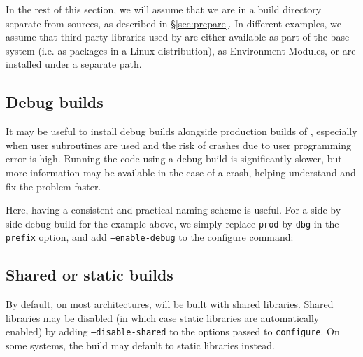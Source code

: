 \documentclass[a4paper,10pt,twoside]{csshortdoc}
\begin{document}
In the rest of this section, we will assume that we are in
a build directory separate from sources, as described in
\S\ref{sec:prepare}. In different examples, we assume
that third-party libraries used by \CS are either available
as part of the base system (i.e. as packages in a Linux distribution),
as Environment Modules, or are installed under a separate path.

\subsection{Debug builds\label{sec:config:shared}}

It may be useful to install debug builds alongside production
builds of \CS, especially when user subroutines are used
and the risk of crashes due to user programming error is high.
Running the code using a debug build is significantly
slower, but more information may be available in the case
of a crash, helping understand and fix the problem faster.

Here, having a consistent and practical naming scheme is useful.
For a side-by-side debug build for the example above, we simply replace \texttt{prod} by
\texttt{dbg} in the \texttt{--prefix} option, and add
\texttt{--enable-debug} to the configure command:


\subsection{Shared or static builds\label{sec:config:shared}}

By default, on most architectures, \CS will be built with shared libraries.
Shared libraries may be disabled (in which case static libraries
are automatically enabled) by adding  {\tt --disable-shared} to the options
passed to {\tt configure}.
On some systems, the build may default to static libraries instead.
\end{document}
